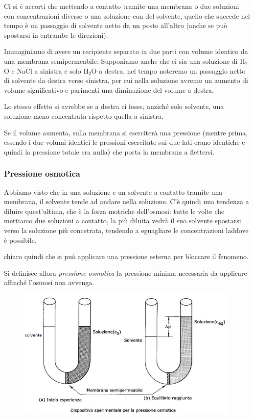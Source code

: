 \vspace{0.3cm}Ci si è accorti che mettendo a contatto tramite una membrana o due soluzioni con concentrazioni diverse o una soluzione con del solvente, quello che succede nel tempo è un passaggio di solvente netto da un posto all'altro (anche se può spostarsi in entrambe le direzioni).

Immaginiamo di avere un recipiente separato in due parti con volume identico da una membrana semipermeabile. Supponiamo anche che ci sia una soluzione di H$_2$O e NaCl a sinistra e solo H$_2$O a destra, nel tempo noteremo un passaggio netto di solvente da destra verso sinistra, per cui nella soluzione avremo un aumento di volume significativo e parimenti una diminuzione del volume a destra.

Lo stesso effetto si avrebbe se a destra ci fosse, anziché solo solvente, una soluzione meno concentrata rispetto quella a sinistra.

Se il volume aumenta, sulla membrana si eserciterà una pressione (mentre prima, essendo i due volumi identici le pressioni esercitate sui due lati erano identiche e quindi la pressione totale era nulla) che porta la membrana a flettersi.
\subsubsection{Pressione osmotica}
Abbiamo visto che in una soluzione e un solvente a contatto tramite una membrana, il solvente tende ad andare nella soluzione. C'è quindi una tendenza a diluire quest'ultima, che è la forza motriche dell'osmosi: tutte le volte che mettiamo due soluzioni a contatto, la più diluita vedrà il suo solvente spostarsi verso la soluzione più concetrata, tendendo a eguagliare le concentrazioni laddove è possibile.

\E chiaro quindi che si può applicare una pressione esterna per bloccare il fenomeno.

Si definisce allora \textit{pressione osmotica} la pressione minima necessaria da applicare affinché l'osmosi non avvenga.

\begin{figure}[htp]
    \centering
    \includegraphics[width=11cm]{immagini/tubo_a_U.png}
\end{figure}

